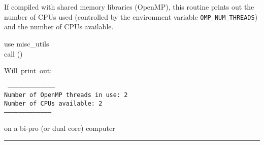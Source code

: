 
\sloppy


\section[brag\_openmp]{ }
\label{sub:brag_openmp}
\author{Eric Hivon}

\begin{facility}
{If compiled with shared memory libraries (OpenMP), this routine prints out the number of
CPUs used (controlled by the environment variable {\tt OMP\_NUM\_THREADS}) and the number of CPUs available.}
{\modMiscUtils}
\end{facility}

\begin{f90format}
{}
\end{f90format}


\begin{example}
{
use misc\_utils \\
call \thedocid() \\
}
{
\parbox[t]{8.2cm}{
Will~print~out: \hfill\\
\parbox[t]{8cm}{\tt
-------------------------------------- \\
Number of OpenMP threads in use:    2 \\
Number of CPUs available:           2 \\
-------------------------------------- }
on a bi-pro (or dual core) computer}
}
\end{example}



\rule{\hsize}{2mm}

\newpage
